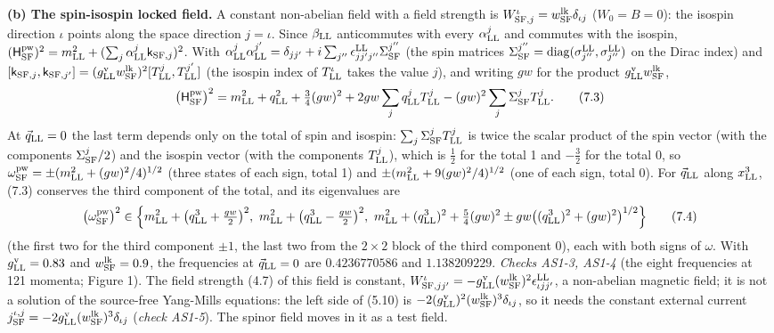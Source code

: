 \documentclass[
  10pt,
]{article}
\begin{document}
\textbf{(b) The spin-isospin locked field.} A constant non-abelian field
with a field strength is
\(W^\iota_{{\rm SF},j}=w^{\rm lk}_{\rm SF}\delta_{\iota j}\)
(\(W_0=B=0\)): the isospin direction \(\iota\) points along the space
direction \(j=\iota\). Since \(\beta_{\rm LL}\) anticommutes with every
\(\alpha^j_{\rm LL}\) and commutes with the isospin,
\((\mathsf H^{\rm pw}_{\rm SF})^2=m_{\rm LL}^2+(\sum_j\alpha^j_{\rm LL}\mathsf k_{{\rm SF},j})^2\).
With
\(\alpha^j_{\rm LL}\alpha^{j'}_{\rm LL}=\delta_{jj'}+i\sum_{j''}\epsilon^{\rm LL}_{jj'j''}\Sigma^{j''}_{\rm SF}\)
(the spin matrices
\(\Sigma^{j''}_{\rm SF}=\mathrm{diag}(\sigma^{\rm LL}_{j''},\sigma^{\rm LL}_{j''})\)
on the Dirac index) and
\([\mathsf k_{{\rm SF},j},\mathsf k_{{\rm SF},j'}]=(g^{\rm v}_{\rm LL}w^{\rm lk}_{\rm SF})^2[T^j_{\rm LL},T^{j'}_{\rm LL}]\)
(the isospin index of \(T^\iota_{\rm LL}\) takes the value \(j\)), and
writing \(gw\) for the product
\(g^{\rm v}_{\rm LL}w^{\rm lk}_{\rm SF}\),
\[\big(\mathsf H^{\rm pw}_{\rm SF}\big)^2=m_{\rm LL}^2+q_{\rm LL}^2+\tfrac34(gw)^2+2gw\sum_jq^j_{\rm LL}T^j_{\rm LL}-(gw)^2\sum_j\Sigma^j_{\rm SF}T^j_{\rm LL}.\tag{7.3}\]
At \(\vec q_{\rm LL}=0\) the last term depends only on the total of spin
and isospin: \(\sum_j\Sigma^j_{\rm SF}T^j_{\rm LL}\) is twice the scalar
product of the spin vector (with the components \(\Sigma^j_{\rm SF}/2\))
and the isospin vector (with the components \(T^j_{\rm LL}\)), which is
\(\tfrac12\) for the total 1 and \(-\tfrac32\) for the total 0, so
\(\omega^{\rm pw}_{\rm SF}=\pm(m_{\rm LL}^2+(gw)^2/4)^{1/2}\) (three
states of each sign, total 1) and \(\pm(m_{\rm LL}^2+9(gw)^2/4)^{1/2}\)
(one of each sign, total 0). For \(\vec q_{\rm LL}\) along
\(x^3_{\rm LL}\), (7.3) conserves the third component of the total, and
its eigenvalues are
\[\big(\omega^{\rm pw}_{\rm SF}\big)^2\in\Big\{m_{\rm LL}^2+\big(q^3_{\rm LL}+\tfrac{gw}2\big)^2,\ m_{\rm LL}^2+\big(q^3_{\rm LL}-\tfrac{gw}2\big)^2,\ m_{\rm LL}^2+(q^3_{\rm LL})^2+\tfrac54(gw)^2\pm gw\big((q^3_{\rm LL})^2+(gw)^2\big)^{1/2}\Big\}\tag{7.4}\]
(the first two for the third component \(\pm1\), the last two from the
\(2\times2\) block of the third component 0), each with both signs of
\(\omega\). With \(g^{\rm v}_{\rm LL}=0.83\) and
\(w^{\rm lk}_{\rm SF}=0.9\), the frequencies at \(\vec q_{\rm LL}=0\)
are \(0.4236770586\) and \(1.138209229\). \emph{Checks AS1-3, AS1-4}
(the eight frequencies at 121 momenta; Figure 1). The field strength
(4.7) of this field is constant,
\(W^\iota_{{\rm SF},jj'}=-g^{\rm v}_{\rm LL}(w^{\rm lk}_{\rm SF})^2\epsilon^{\rm LL}_{\iota jj'}\),
a non-abelian magnetic field; it is not a solution of the source-free
Yang-Mills equations: the left side of (5.10) is
\(-2(g^{\rm v}_{\rm LL})^2(w^{\rm lk}_{\rm SF})^3\delta_{\iota j}\), so
it needs the constant external current
\(j^{\iota,j}_{\rm SF}=-2g^{\rm v}_{\rm LL}(w^{\rm lk}_{\rm SF})^3\delta_{\iota j}\)
(\emph{check AS1-5}). The spinor field moves in it as a test field.
\end{document}
